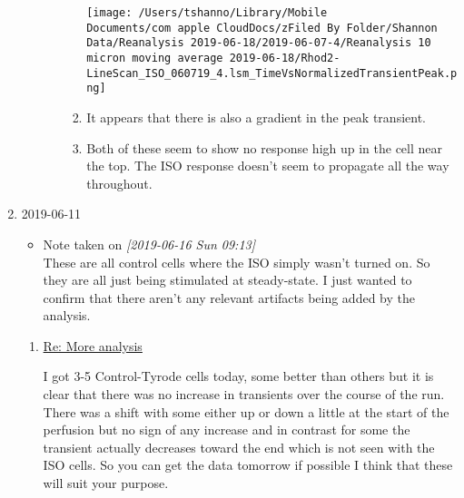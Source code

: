 \documentclass[11pt]{article}
\begin{document}
\begin{enumerate}
\begin{enumerate}
\begin{enumerate}
\begin{enumerate}
\begin{center}
\end{center}
 \begin{center}
\texttt{[image: /Users/tshanno/Library/Mobile Documents/com~apple~CloudDocs/zFiled By Folder/Shannon Data/Reanalysis 2019-06-18/2019-06-07-4/Reanalysis 10 micron moving average 2019-06-18/Rhod2-LineScan\_ISO\_060719\_4.lsm\_TimeVsNormalizedTransientPeak.png]}
\end{center}
\item It appears that there is also a gradient in the peak transient.
\label{sec:org916480d}
\item Both of these seem to show no response high up in the cell near the top.  The ISO response doesn't seem to propagate all the way throughout.
\label{sec:org696f2fb}
\end{enumerate}
\end{enumerate}
\end{enumerate}
\item 2019-06-11
\label{sec:org39f180b}
\begin{itemize}
\item Note taken on \textit{[2019-06-16 Sun 09:13] } \\
These are all control cells where the ISO simply wasn't turned on.  So they are all just being stimulated at steady-state.  I just wanted to confirm that there aren't any relevant artifacts being added by the analysis.
\end{itemize}
\begin{enumerate}
\item \href{//\%3c9A0A9BA1-B4AA-4CB0-B52B-1D8F6E5A7BBF@rush.edu\%3E}{Re: More analysis}
\label{sec:org2d4f3a0}


I got 3-5 Control-Tyrode cells today, some better than others but it is clear that there was no increase in transients over the course of the run.  There was a shift with some either up or down a little at the start of the perfusion but no sign of any increase and in contrast for some the transient actually decreases toward the end which is not seen with the ISO cells.  So you can get the data tomorrow if possible I think that these will suit your purpose. 


\end{enumerate}
\end{enumerate}
\end{document}
